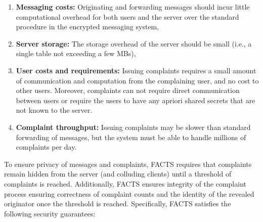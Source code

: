 \begin{enumerate}
    \item \textbf{Messaging costs:}  Originating and forwarding messages should incur little computational overhead for both users and the server over the standard procedure in the encrypted messaging system,
    \item \textbf{Server storage:} The storage overhead of the server should be small (i.e., a single table not exceeding a few MBs),
    \item \textbf{User costs and requirements:}
    Issuing complaints requires a small amount of communication and computation from the complaining user, and no cost to other users.  Moreover, complaints can not require direct communication between users or require the users to have any apriori shared secrets that are not known to the server.
    \item \textbf{Complaint throughput:}  Issuing complaints may be slower than standard forwarding of messages, but the system must be able to handle millions of complaints per day. 
\end{enumerate}

To ensure privacy of messages and complaints, FACTS requires that complaints remain hidden from the server (and colluding clients) until a threshold of complaints is reached.  Additionally, FACTS ensures integrity of the complaint process ensuring correctness of complaint counts and the identity of the revealed originator once the threshold is reached. Specifically, FACTS satisfies the following security guarantees:

